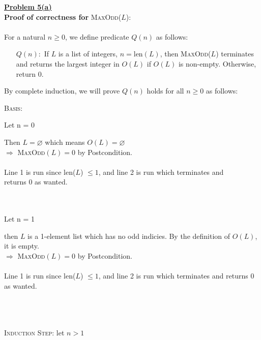 \documentclass[12pt]{article}
\begin{document}
{\LARGE \noindent \underline{\textbf{Problem 5(a)}}}\\

\noindent \textbf{Proof of correctness for} \textsc{MaxOdd($L$)}:
\\\\
For a natural $n \geq 0$, we define predicate $Q(n)$ as follows:
\begin{itemize}[leftmargin=20mm]
	\item [$Q(n):$]If $L$ is a list of integers, $n = \text{len}(L)$, then \textsc{MaxOdd($L$)}
	      terminates and returns the largest integer in $O(L)$ if $O(L)$ is non-empty. Otherwise, return 0.
\end{itemize}
By complete induction, we will prove $Q(n)$ holds for all $n \geq 0$ as follows:\\
\vspace*{1mm}

\noindent \textsc{Basis:} %
\vspace*{1mm}

\hfill\begin{minipage}{\dimexpr\textwidth-10mm}
	Let n = 0
	\vspace*{1mm}

	\hfill\begin{minipage}{\dimexpr\textwidth-10mm}
		Then $L = \varnothing$ which means $O(L) = \varnothing$\\
		$\Longrightarrow$ \textsc{MaxOdd}$(L) = 0$ by Postcondition.
		\\\\
		Line 1 is run since len($L$) $\leq 1$, and line 2 is run which terminates and\\ returns 0 as wanted.\\
	\end{minipage}\\\\
	Let n = 1
	\vspace*{1mm}

	\hfill\begin{minipage}{\dimexpr\textwidth-10mm}
		then $L$ is a 1-element list which has no odd indicies.
		By the definition of $O(L)$, it is empty.\\
		$\Longrightarrow$ \textsc{MaxOdd}$(L) = 0$ by Postcondition.
		\\\\
		Line 1 is run since len($L$) $\leq 1$, and line 2 is run which terminates and returns 0 as wanted.
	\end{minipage}
\end{minipage}
\\\\\\
\noindent \textsc{Induction Step:} let $n > 1$ %
\vspace*{1mm}
\end{document}
